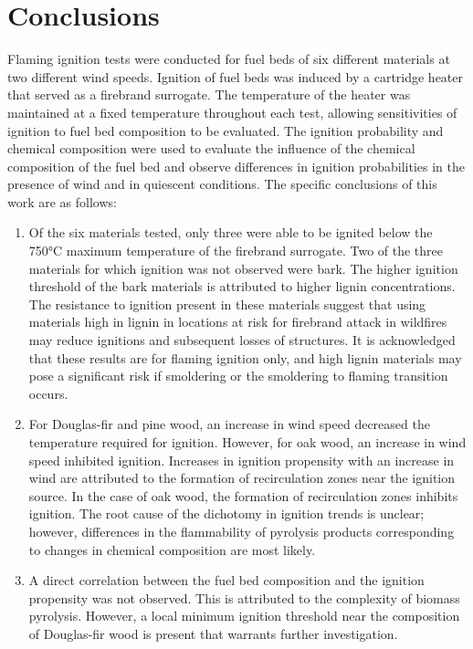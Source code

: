 \section{Conclusions}
\label{sec:conclusions3}    
    Flaming ignition tests were conducted for fuel beds of six different materials at two different wind speeds. Ignition of fuel beds was induced by a cartridge heater that served as a firebrand surrogate. The temperature of the heater was maintained at a fixed temperature throughout each test, allowing sensitivities of ignition to fuel bed composition to be evaluated. The ignition probability and chemical composition were used to evaluate the influence of the chemical composition of the fuel bed and observe differences in ignition probabilities in the presence of wind and in quiescent conditions. The specific conclusions of this work are as follows:
        \begin{enumerate}
            \item Of the six materials tested, only three were able to be ignited below the 750\si{\celsius} maximum temperature of the firebrand surrogate. Two of the three materials for which ignition was not observed were bark. The higher ignition threshold of the bark materials is attributed to higher lignin concentrations. The resistance to ignition present in these materials suggest that using materials high in lignin in locations at risk for firebrand attack in wildfires may reduce ignitions and subsequent losses of structures. It is acknowledged that these results are for flaming ignition only, and high lignin materials may pose a significant risk if smoldering or the smoldering to flaming transition occurs.
            
            \item For Douglas-fir and pine wood, an increase in wind speed decreased the temperature required for ignition. However, for oak wood, an increase in wind speed inhibited ignition. Increases in ignition propensity with an increase in wind are attributed to the formation of recirculation zones near the ignition source. In the case of oak wood, the formation of recirculation zones inhibits ignition. The root cause of the dichotomy in ignition trends is unclear; however, differences in the flammability of pyrolysis products corresponding to changes in chemical composition are most likely.
            
            \item A direct correlation between the fuel bed composition and the ignition propensity was not observed. This is attributed to the complexity of biomass pyrolysis. However, a local minimum ignition threshold near the composition of Douglas-fir wood is present that warrants further investigation. 
        \end{enumerate}
